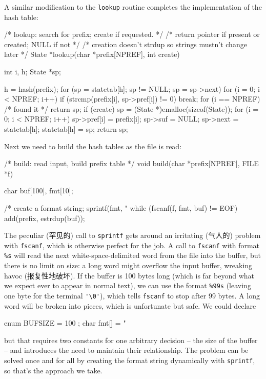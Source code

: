 A similar modification to the \verb'lookup' routine completes the
implementation of the hash table:
\begin{wellcode}
    /* lookup: search for prefix; create if requested. */
    /* return pointer if present or created; NULL if not */
    /* creation doesn't strdup so strings mustn't change later */
    State *lookup(char *prefix[NPREF], int create)
    {
        int i, h;
        State *sp;

        h = hash(prefix);
        for (sp = statetab[h]; sp != NULL; sp = sp->next) {
            for (i = 0; i < NPREF; i++)
                if (strcmp(prefix[i], sp->pref[i]) != 0)
                    break;
            for (i == NPREF)    /* found it */
                return sp;
        }
        if (create) {
            sp = (State *)emalloc(sizeof(State));
            for (i = 0; i < NPREF; i++)
                sp->pref[i] = prefix[i];
            sp->suf = NULL;
            sp->next = statetab[h];
            statetab[h] = sp;
        }
        return sp;
    }
\end{wellcode}

Next we need to build the hash tables as the file is read:
\begin{wellcode}
    /* build: read input, build prefix table */
    void build(char *prefix[NPREF], FILE *f)
    {
        char    buf[100], fmt[10];

        /* create a format string; %
        sprintf(fmt, "%
        while (fscanf(f, fmt, buf) != EOF)
            add(prefix, estrdup(buf));
    }
\end{wellcode}

The peculiar (罕见的) call to \verb'sprintf' gets around an irritating
(气人的) problem with \verb'fscanf', which is otherwise perfect for the
job. A call to \verb'fscanf' with format \verb'%s' will read the next
white-space-delimited word from the file into the buffer, but there is no
limit on size: a long word might overflow the input buffer, wreaking havoc
(报复性地破坏). If the buffer is 100 bytes long (which is far beyond what
we expect ever to appear in normal text), we can use the format \verb'%99s'
(leaving one byte for the terminal \verb"'\0'"), which tells \verb'fscanf'
to stop after 99 bytes. A long word will be broken into pieces, which is
unfortunate but safe. We could declare
\begin{badcode}
    enum { BUFSIZE = 100 };
    char    fmt[] = "%
\end{badcode}
but that requires two constants for one arbitrary decision -- the size of
the buffer -- and introduces the need to maintain their relationship. The
problem can be solved once and for all by creating the format string
dynamically with \verb'sprintf', so that's the approach we take.

